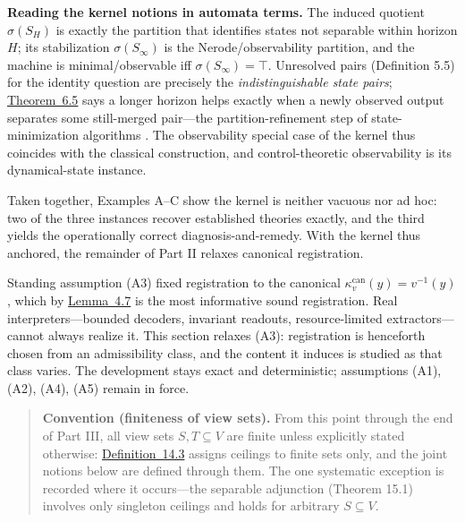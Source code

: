 \textbf{Reading the kernel notions in automata terms.} The induced quotient \(\sigma(S_H)\) is exactly the partition that identifies states not separable within horizon \(H\); its stabilization \(\sigma(S_\infty)\) is the Nerode/observability partition, and the machine is minimal/observable iff \(\sigma(S_\infty)=\top\). Unresolved pairs (Definition 5.5) for the identity question are precisely the \emph{indistinguishable state pairs}; \hyperlink{stmt:6.5}{Theorem~6.5} says a longer horizon helps exactly when a newly observed output separates some still-merged pair---\hspace{0pt}the partition-refinement step of state-minimization algorithms \autocite{hopcroft1979}. The observability special case of the kernel thus coincides with the classical construction, and control-theoretic observability \autocite{kalman1963} is its dynamical-state instance.

Taken together, Examples A--C show the kernel is neither vacuous nor ad hoc: two of the three instances recover established theories exactly, and the third yields the operationally correct diagnosis-and-remedy. With the kernel thus anchored, the remainder of Part II relaxes canonical registration.


Standing assumption (A3) fixed registration to the canonical \(\kappa^{\mathrm{can}}_v(y)=v^{-1}(y)\), which by \hyperlink{stmt:4.7}{Lemma~4.7} is the most informative sound registration. Real interpreters---\hspace{0pt}bounded decoders, invariant readouts, resource-limited extractors---\hspace{0pt}cannot always realize it. This section relaxes (A3): registration is henceforth chosen from an admissibility class, and the content it induces is studied as that class varies. The development stays exact and deterministic; assumptions (A1), (A2), (A4), (A5) remain in force.

\begin{quote}
\textbf{Convention (finiteness of view sets).} From this point through the end of Part III, all view sets \(S, T \subseteq V\) are finite unless explicitly stated otherwise: \hyperlink{stmt:14.3}{Definition~14.3} assigns ceilings to finite sets only, and the joint notions below are defined through them. The one systematic exception is recorded where it occurs---\hspace{0pt}the separable adjunction (Theorem 15.1) involves only singleton ceilings and holds for arbitrary \(S \subseteq V\).
\end{quote}

